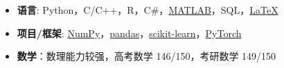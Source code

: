   \begin{itemize}[leftmargin=*]
    \item \textbf{语言}: Python，C/C++，R，C\#，\href{https://www.mathworks.com/}{MATLAB}，SQL，\href{https://www.latex-project.org/}{\LaTeX}
    \item \textbf{项目/框架}: \href{http://www.numpy.org/}{NumPy}，\href{https://pandas.pydata.org/}{pandas}，\href{http://scikit-learn.org//}{scikit-learn}，\href{https://pytorch.org/}{PyTorch}
    \item \textbf{数学}：数理能力较强，高考数学 146/150，考研数学 149/150
  \end{itemize}